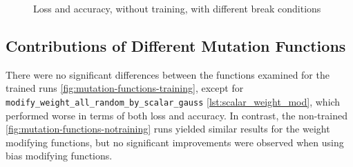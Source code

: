 \begin{figure}
\begin{subfigure}{0.5\textwidth}
    \end{subfigure}
    \caption{Loss and accuracy, without training, with different break conditions}
    \label{fig:break-conditions-notraining}
\end{figure}
\subsection{Contributions of Different Mutation Functions}\label{subsec:contributions-of-different-mutation-functions}
There were no significant differences between the functions examined for the trained runs \ref{fig:mutation-functions-training}, except for \texttt{modify\_weight\_all\_random\_by\_scalar\_gauss} \ref{lst:scalar_weight_mod}, which performed worse in terms of both loss and accuracy.
In contrast, the non-trained \ref{fig:mutation-functions-notraining} runs yielded similar results for the weight modifying functions, but no significant improvements were observed when using bias modifying functions.
